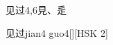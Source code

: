 \begin{entry}{见过}{4,6}{⾒、⾡}
  \begin{phonetics}{见过}{jian4 guo4}[][HSK 2]
  \end{phonetics}
\end{entry}
